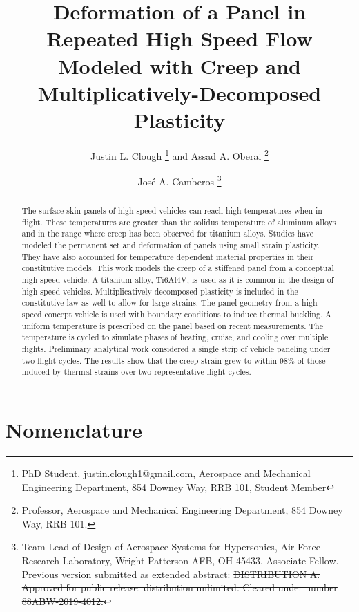 \documentclass[conf]{new-aiaa}
\title{ Deformation of a Panel in Repeated High Speed Flow 
        Modeled with Creep and Multiplicatively-Decomposed Plasticity}
\author{Justin L. Clough%
        \footnote{
          PhD Student, 
          justin.clough1@gmail.com,
          Aerospace and Mechanical Engineering Department, 
          854 Downey Way, RRB 101,
          Student Member}
        and Assad A. Oberai%
        \footnote{  
          Professor, 
          Aerospace and Mechanical Engineering Department, 
          854 Downey Way, RRB 101.}}
\affil{University of Southern California,
       Los Angeles, CA, 90089}
\author{Jos\'e A. Camberos%
        \footnote{
          Team Lead of Design of Aerospace Systems for Hypersonics, 
          Air Force Research Laboratory,
          Wright-Patterson AFB, OH 45433,
          Associate Fellow.
          \newline
          \newline
          Previous version submitted as extended abstract:
            \sout{DISTRIBUTION A. Approved for public release: distribution unlimited. 
            Cleared under number 88ABW-2019-4012.}}}
\affil{Air Force Research Laboratory, Wright-Patterson AFB,
       Dayton, OH, 45433}
\begin{document}
\maketitle

\begin{abstract}
The surface skin panels of high speed vehicles can reach high 
temperatures when in flight. 
These temperatures are greater than the solidus temperature
of aluminum alloys and in the range where
creep has been observed for titanium alloys.
Studies have modeled the permanent set and deformation 
of panels using small strain plasticity.
They have also accounted for temperature
dependent material properties in their constitutive models.
This work models the creep of a stiffened panel
from a conceptual high speed vehicle.
A titanium alloy, Ti6Al4V,
is used as it is common in the design of high speed vehicles.
Multiplicatively-decomposed plasticity 
is included in the constitutive law as well to allow for large strains.
The panel geometry from a high speed concept vehicle is
used with boundary conditions to induce thermal buckling.
A uniform temperature is prescribed on the panel
based on recent measurements.
The temperature is cycled to simulate phases of
heating, cruise, and cooling over multiple flights.
Preliminary analytical work considered a single strip
of vehicle paneling under two flight cycles.
The results show that the creep strain
grew to within 98\% of those induced by thermal strains 
over two representative flight cycles.
\end{abstract}

\section{Nomenclature}
\end{document}
